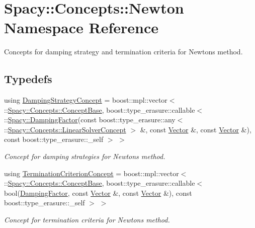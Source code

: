 \hypertarget{namespaceSpacy_1_1Concepts_1_1Newton}{}\section{Spacy\+:\+:Concepts\+:\+:Newton Namespace Reference}
\label{namespaceSpacy_1_1Concepts_1_1Newton}


Concepts for damping strategy and termination criteria for Newton\textquotesingle{}s method.  


\subsection*{Typedefs}
\begin{DoxyCompactItemize}
\item 
using \hyperlink{group__NewtonConceptGroup_ga8da917ba6de9c283c1509281956bb04a_ga8da917ba6de9c283c1509281956bb04a}{Damping\+Strategy\+Concept} = boost\+::mpl\+::vector$<$ \+::\hyperlink{group__ConceptGroup_ga63426675cc05ccce03ead56a4fa90d96_ga63426675cc05ccce03ead56a4fa90d96}{Spacy\+::\+Concepts\+::\+Concept\+Base}, boost\+::type\+\_\+erasure\+::callable$<$ \+::\hyperlink{classSpacy_1_1DampingFactor}{Spacy\+::\+Damping\+Factor}(const boost\+::type\+\_\+erasure\+::any$<$ \+::\hyperlink{group__ConceptGroup_gac7d6a94c7131c8613e2ab26fddeb50bd_gac7d6a94c7131c8613e2ab26fddeb50bd}{Spacy\+::\+Concepts\+::\+Linear\+Solver\+Concept} $>$ \&, const \hyperlink{classSpacy_1_1Vector}{Vector} \&, const \hyperlink{classSpacy_1_1Vector}{Vector} \&), const boost\+::type\+\_\+erasure\+::\+\_\+self $>$ $>$
\begin{DoxyCompactList}\small\item\em Concept for damping strategies for Newton\textquotesingle{}s method. \end{DoxyCompactList}\item 
using \hyperlink{group__NewtonConceptGroup_ga7d7604bea8b7c261d3179a7e95ffbe76_ga7d7604bea8b7c261d3179a7e95ffbe76}{Termination\+Criterion\+Concept} = boost\+::mpl\+::vector$<$ \+::\hyperlink{group__ConceptGroup_ga63426675cc05ccce03ead56a4fa90d96_ga63426675cc05ccce03ead56a4fa90d96}{Spacy\+::\+Concepts\+::\+Concept\+Base}, boost\+::type\+\_\+erasure\+::callable$<$ bool(\hyperlink{classSpacy_1_1DampingFactor}{Damping\+Factor}, const \hyperlink{classSpacy_1_1Vector}{Vector} \&, const \hyperlink{classSpacy_1_1Vector}{Vector} \&), const boost\+::type\+\_\+erasure\+::\+\_\+self $>$ $>$
\begin{DoxyCompactList}\small\item\em Concept for termination criteria for Newton\textquotesingle{}s method. \end{DoxyCompactList}\end{DoxyCompactItemize}


